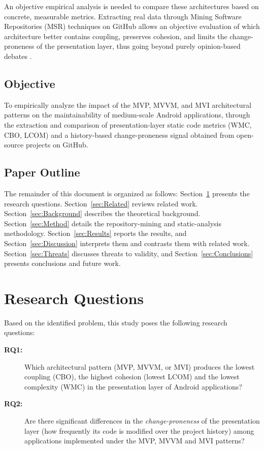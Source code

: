 \documentclass[conference]{IEEEtran}
\begin{document}
An objective empirical analysis is needed to compare these architectures
based on concrete, measurable metrics. Extracting real data through Mining
Software Repositories (MSR) techniques on GitHub allows an objective evaluation
of which architecture better contains coupling, preserves cohesion, and limits
the change-proneness of the presentation layer, thus going beyond purely
opinion-based debates \cite{Kalliamvakou:2014}.

\subsection{Objective}

To empirically analyze the impact of the MVP, MVVM, and MVI architectural
patterns on the maintainability of medium-scale Android applications, through
the extraction and comparison of presentation-layer static code metrics
(WMC, CBO, LCOM) and a history-based change-proneness signal obtained from
open-source projects on GitHub.

\subsection{Paper Outline}

The remainder of this document is organized as follows: Section~\ref{sec:RQ}
presents the research questions. Section~\ref{sec:Related} reviews related work.
Section~\ref{sec:Background} describes the theoretical background.
Section~\ref{sec:Method} details the repository-mining and static-analysis
methodology. Section~\ref{sec:Results} reports the results, and
Section~\ref{sec:Discussion} interprets them and contrasts them with related
work. Section~\ref{sec:Threats} discusses threats to validity, and
Section~\ref{sec:Conclusions} presents conclusions and future work.

\section{Research Questions} \label{sec:RQ}

Based on the identified problem, this study poses the following research
questions:

\begin{description}
  \item[\textbf{RQ1:}] Which architectural pattern (MVP, MVVM, or MVI)
  produces the lowest coupling (CBO), the highest cohesion (lowest LCOM)
  and the lowest complexity (WMC) in the presentation layer of Android
  applications?
  \item[\textbf{RQ2:}] Are there significant differences in the
  \textit{change-proneness} of the presentation layer (how frequently its
  code is modified over the project history) among applications implemented
  under the MVP, MVVM and MVI patterns?
\end{description}
\end{document}
